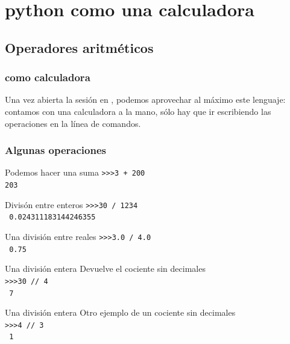 {\section{python como una calculadora}
\subsection{Operadores aritméticos}
\begin{frame}
\frametitle{\python como calculadora}
Una vez abierta la sesión en \python, podemos aprovechar al máximo este lenguaje: contamos con una calculadora a la mano, sólo hay que ir escribiendo las operaciones en la línea de comandos.
\end{frame}
\begin{frame}[fragile]
\frametitle{Algunas operaciones}
\begin{block}{Podemos hacer una suma}
\verb|>>>3 + 200| \\
\pause
\verb|203|
\end{block}
\end{frame}
\begin{frame}[fragile]
\begin{block}{Divisón entre enteros}
\verb|>>>30 / 1234| \\
\pause
\verb| 0.024311183144246355|
\end{block}
\end{frame}
\begin{frame}[fragile]
\begin{block}{Una división entre reales}
\verb|>>>3.0 / 4.0| \\
\pause
\verb| 0.75|
\end{block}
\end{frame}
\begin{frame}[fragile]
\begin{block}{Una división entera}
Devuelve el cociente sin decimales \\
\verb|>>>30 // 4| \\
\pause
\verb| 7|
\end{block}
\end{frame}
\begin{frame}[fragile]
\begin{block}{Una división entera}
Otro ejemplo de un cociente sin decimales \\
\verb|>>>4 // 3| \\
\pause
\verb| 1|
\end{block}

\end{frame}}
